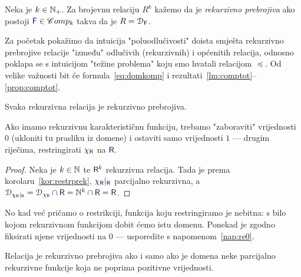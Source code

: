 \begin{definicija}[{name=[rekurzivna prebrojivost]}]\label{def:re}
Neka je $k\in{\mathbb N}_+$. Za brojevnu relaciju $R^k$ kažemo da je \emph{rekurzivno prebrojiva} ako postoji $\f F\in\mathscr Comp_k$ takva da je $R=\dom{\f F}$.
\end{definicija}



Za početak pokažimo da intuicija "poluodlučivosti" doista smješta rekurzivno prebrojive relacije "između" odlučivih (rekurzivnih) i općenitih relacija, odnosno poklapa se s intuicijom "težine problema" koju smo hvatali relacijom $\preceq$. Od velike važnosti bit će formula~\eqref{eq:domkomp} i rezultati~\ref{lm:comptot}--\ref{prop:comptot}.

\begin{propozicija}[{name=[rekurzivna prebrojivost rekurzivnih relacija]}]\label{pp:rekire}
Svaka rekurzivna relacija je rekurzivno prebrojiva.
\end{propozicija}
Ako imamo rekurzivnu karakterističnu funkciju, trebamo "zaboraviti" vrijednosti $0$ (ukloniti tu prasliku iz domene) i ostaviti samo vrijednosti $1$ --- drugim riječima, restringirati $\chi_{\f R}$ na $\f R$.
\begin{proof}
Neka je $k\in{\mathbb N}$ te $\f R^k$ rekurzivna relacija. Tada je prema korolaru~\ref{kor:restrprek}, $\chi_{\f R}|_{\f R}$ parcijalno rekurzivna, a $\dom{\chi_{\f R}|_{\f R}}=\dom{\chi_{\f R}}\cap\f R=\N^k\cap\f R=\f R$.
\end{proof}

No kad već pričamo o restrikciji, funkcija koju restringiramo je nebitna: s bilo kojom rekurzivnom funkcijom dobit ćemo istu domenu. Ponekad je zgodno fiksirati njene vrijednosti na $0$ --- usporedite s napomenom~\ref{nap:re0}.

\begin{korolar}[{name=[za rekurzivno prebrojive domene vrijednosti funkcije nisu bitne]}]\label{kor:redom0im}
Relacija je rekurzivno prebrojiva ako i samo ako je domena neke parcijalno rekurzivne funkcije koja ne poprima pozitivne vrijednosti.
\end{korolar}

